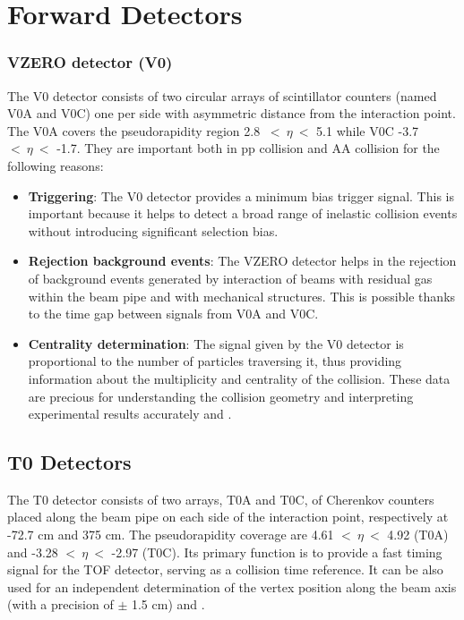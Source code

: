 \documentclass[12pt,a4paper]{book}
\begin{document}
	\section{Forward Detectors}
	\subsubsection{VZERO detector (V0)} 
	The V0 detector consists of two circular arrays of scintillator counters (named V0A and V0C) one per side with asymmetric distance from the interaction point. The V0A covers the pseudorapidity region 2.8 $\ <\ \eta \ <$ 5.1 while V0C -3.7 $<\ \eta \ <$ -1.7. They are important both in pp collision and AA collision for the following reasons:
	\begin{itemize}
		\item \textbf{Triggering}: The V0 detector provides a minimum bias trigger signal. This is important because it helps to detect a broad range of inelastic collision events without introducing significant selection bias.
		\item \textbf{Rejection background events}: The VZERO detector helps in the rejection of background events generated by interaction of beams with residual gas within the beam pipe and with mechanical structures. This is possible thanks to the time gap between signals from V0A and V0C.
		\item \textbf{Centrality determination}: The signal given by the V0 detector is proportional to
		the number of particles traversing it, thus providing information about the multiplicity and centrality of the collision. These data are precious for understanding the collision geometry and interpreting experimental results accurately \cite{Padhan:2924203} and \cite{amsdottorato9036}.
	\end{itemize}	
	
	\subsection{T0 Detectors}
	The T0 detector consists of two arrays, T0A and T0C, of Cherenkov counters placed along the beam pipe on each side of the interaction point, respectively at -72.7 cm and 375 cm.  The pseudorapidity coverage are	4.61 $<\ \eta\ <$ 4.92 (T0A) and -3.28 $<\ \eta\ <$ -2.97 (T0C). Its primary function is to provide a fast timing signal for the TOF detector, serving as a collision time reference. It can be also used for an independent determination of the vertex position along the beam axis (with a precision of $\pm$ 1.5 cm) \cite{Padhan:2924203} and \cite{amsdottorato9036}.	
	
\end{document}
